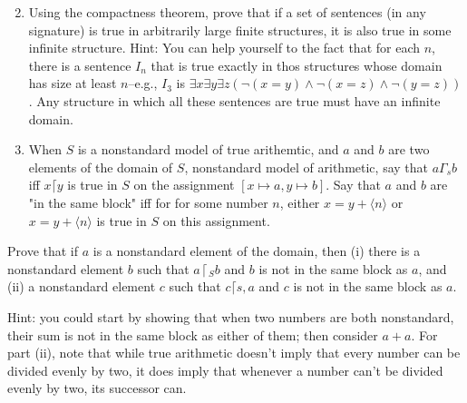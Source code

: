 \documentclass[10pt]{article}
\begin{document}
\begin{enumerate}
  \setcounter{enumi}{1}
  \item Using the compactness theorem, prove that if a set of sentences (in any signature) is true in arbitrarily large finite structures, it is also true in some infinite structure. Hint: You can help yourself to the fact that for each \(n\), there is a sentence \(I_{n}\) that is true exactly in thos structures whose domain has size at least \(n\)--e.g., \(I_{3}\) is \(\exists x \exists y \exists z(\neg(x=y) \wedge \neg(x=z) \wedge \neg(y=z))\). Any structure in which all these sentences are true must have an infinite domain.

  \item When \(S\) is a nonstandard model of true arithemtic, and \(a\) and \(b\) are two elements of the domain of \(S\), nonstandard model of arithmetic, say that \(a \Gamma_{s} b\) iff \(x\lceil y\) is true in \(S\) on the assignment \([x \mapsto a, y \mapsto b]\). Say that \(a\) and \(b\) are "in the same block" iff for for some number \(n\), either \(x=y+\langle n\rangle\) or \(x=y+\langle n\rangle\) is true in \(S\) on this assignment.

\end{enumerate}

Prove that if \(a\) is a nonstandard element of the domain, then (i) there is a nonstandard element \(b\) such that \(a\left\lceil_{S} b\right.\) and \(b\) is not in the same block as \(a\), and (ii) a nonstandard element \(c\) such that \(c\lceil s, a\) and \(c\) is not in the same block as \(a\).

Hint: you could start by showing that when two numbers are both nonstandard, their sum is not in the same block as either of them; then consider \(a+a\). For part (ii), note that while true arithmetic doesn't imply that every number can be divided evenly by two, it does imply that whenever a number can't be divided evenly by two, its successor can.
\end{document}
